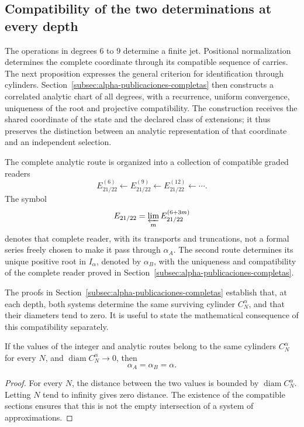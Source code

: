 \subsection{Compatibility of the two determinations at every depth}
\label{subsec:alpha-limite-dos-vias}

\begin{remark}
The operations in degrees \(6\) to \(9\) determine a finite jet.
Positional normalization determines the complete coordinate through
its compatible sequence of carries. The next proposition expresses
the general criterion for identification through cylinders.
Section~\ref{subsec:alpha-publicaciones-completas} then constructs
a correlated analytic chart of all degrees, with a recurrence,
uniform convergence, uniqueness of the root and projective compatibility.
The construction receives the shared coordinate of the state and the declared
class of extensions; it thus preserves the distinction between an
analytic representation of that coordinate and an independent selection.
\end{remark}

The complete analytic route is organized into a collection of compatible graded
readers
\[
 E_{21/22}^{(6)}\longleftarrow E_{21/22}^{(9)}
 \longleftarrow E_{21/22}^{(12)}\longleftarrow\cdots.
\]
The symbol
\[
 E_{21/22}=\varprojlim_m E_{21/22}^{(6+3m)}
\]
denotes that complete reader, with its transports and truncations, not a
formal series freely chosen to make it pass through \(\alpha_A\).
The second route determines its unique positive root in \(I_\alpha\),
denoted by \(\alpha_B\), with the uniqueness and compatibility of the
complete reader proved in Section~\ref{subsec:alpha-publicaciones-completas}.

The proofs in Section~\ref{subsec:alpha-publicaciones-completas}
establish that, at each depth, both systems determine the same
surviving cylinder \(C_N^\alpha\), and that their diameters tend to
zero. It is useful to state the mathematical consequence of this
compatibility separately.

\begin{proposition}
\label{prop:alpha-dos-limites}
If the values of the integer and analytic routes belong to the
same cylinders \(C_N^\alpha\) for every \(N\), and
\(\operatorname{diam}C_N^\alpha\to0\), then
\[
 \alpha_A=\alpha_B=\alpha.
\]
\end{proposition}

\begin{proof}
For every \(N\), the distance between the two values is bounded
by \(\operatorname{diam}C_N^\alpha\). Letting \(N\) tend to infinity
gives zero distance. The existence of the compatible sections ensures
that this is not the empty intersection of a system of approximations.
\end{proof}

